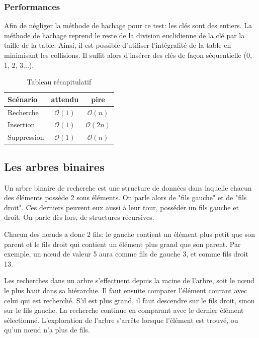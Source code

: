 \documentclass[hidelinks,a4paper, 12pt]{article}
\begin{document}
	\subsubsection*{Performances}
	
	Afin de négliger la méthode de hachage pour ce test: les clés sont des entiers. La méthode de hachage reprend le reste de la division euclidienne de la clé par la taille de la table. Ainsi, il est possible d'utiliser l'intégralité de la table en minimisant les collisions. Il suffit alors d'insérer des clés de façon séquentielle (0, 1, 2, 3...).
	
	 \begin{table}[h]
	 	\begin{tabular}{|l|c|c|}
	 		\hline
	 		Scénario & attendu & pire \\
	 		\hline
	 		Recherche & $\mathcal{O}(1)$ & $\mathcal{O}(n)$ \\ 
	 		\hline
	 		Insertion & $\mathcal{O}(1)$ & $\mathcal{O}(2n)$ \\
	 		\hline
	 		Suppression & $\mathcal{O}(1)$ & $\mathcal{O}(n)$\\
	 		\hline
	 	\end{tabular}
	 	\caption{Tableau récapitulatif}
	 \end{table}
	
	\newpage
	\subsection{Les arbres binaires}\label{BinaryTree}
	Un arbre binaire de recherche est une structure de données dans laquelle chacun des éléments possède 2 sous éléments. On parle alors de "fils gauche" et de "fils droit". Ces derniers peuvent eux aussi à leur tour, posséder un fils gauche et droit. On parle dès lors, de structures récursives.
	
	
	
	Chacun des nœuds a donc 2 fils: le gauche contient un élément plus petit que son parent et le fils droit qui contient un élément plus grand que son parent. Par exemple, un nœud de valeur 5 aura comme fils de gauche 3, et comme fils droit 13.
	
	Les recherches dans un arbre s'effectuent depuis la racine de l'arbre, soit le nœud le plus haut dans sa hiérarchie. Il faut ensuite comparer l'élément courant avec celui qui est recherché. S'il est plus grand, il faut descendre sur le fils droit, sinon sur le fils gauche. La recherche continue en comparant avec le dernier élément sélectionné. L'exploration de l'arbre s'arrête lorsque l'élément est trouvé, ou qu'un nœud n'a plus de fils.
	
\end{document}
